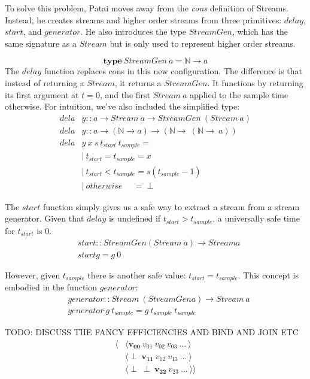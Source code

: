 \documentclass[twocolumn,11pt,english]{article}
\begin{document}
To solve this problem, Patai moves away from the \textit{cons} definition of Streams. Instead, he creates streams and higher order streams from three primitives: $delay$, $start$, and $generator$. He also introduces the type $StreamGen$, which has the same signature as a $Stream$ but is only used to represent higher order streams. 

\small
\begin{equation}
  \mathbf{type}~\mathit{StreamGen~a} = \mathbb{N} \rightarrow a
\end{equation}
\normalsize
The $delay$ function replaces cons in this new configuration. The difference is that instead of returning a $Stream$, it returns a $StreamGen$. It functions by returning its first argument at $t = 0$, and the first $Stream~a$ applied to the sample time otherwise. For intuition, we've also included the simplified type:
\small
\begin{align*}
dela&y :: a \rightarrow Stream~a \rightarrow StreamGen~(Stream~a)\\
dela&y :: a \rightarrow (\mathbb{N} \rightarrow a) \rightarrow (\mathbb{N} \rightarrow~(\mathbb{N} \rightarrow~a))\\
dela&y~x~s~t_{start}~t_{sample} =\\
&|~t_{start} = t_{sample} = x\\
&|~t_{start} < t_{sample} = s (t_{sample} - 1)\\
&|~otherwise ~~~~~~=\perp
\end{align*}
\normalsize

The $start$ function simply gives us a safe way to extract a stream from a stream generator. Given that $delay$ is undefined if $t_{start} > t_{sample}$, a universally safe time for $t_{start}$ is 0.
\small
\begin{align*}
&start :: StreamGen (Stream~a) \rightarrow Stream a\\
&start g = g~0
\end{align*}
\normalsize

However, given $t_{sample}$ there is another safe value: $t_{start} = t_{sample}$. This concept is embodied in the function $generator$: 
\small
\begin{align*}
&generator :: Stream~ (StreamGen a) \rightarrow Stream~a\\
&generator~g~t_{sample} = g~t_{sample}~t_{sample}
\end{align*}
\normalsize


TODO: DISCUSS THE FANCY EFFICIENCIES AND BIND AND JOIN ETC
\begin{align*}
  \langle &\langle \mathbf{v_{00}} ~ v_{01} ~ v_{02} ~ v_{03} ~ ... ~ \rangle \\
  &\langle \perp ~ \mathbf{v_{11}} ~ v_{12} ~ v_{13} ~... ~ \rangle \\
  &\langle \perp ~ \perp ~ \mathbf{v_{22}} ~ v_{23} ~ ...  ~ \rangle \rangle
\end{align*}
\end{document}
